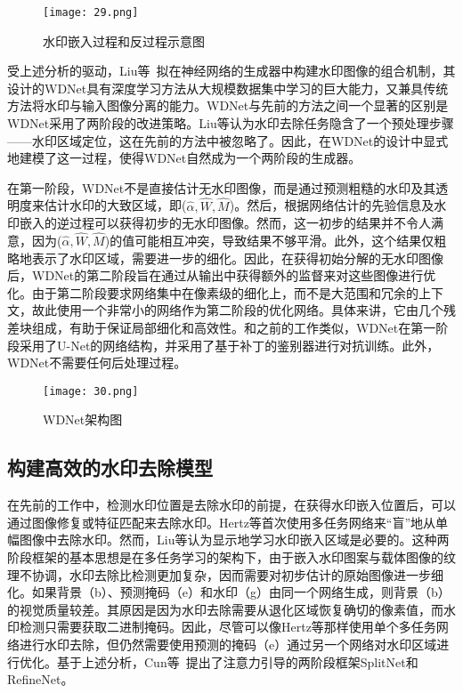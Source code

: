 \begin{figure}[!htbp]
	\centering
	\texttt{[image: 29.png]}
	\caption{水印嵌入过程和反过程示意图}
	\label{fig:29}
\end{figure}

受上述分析的驱动，Liu等~\cite{liu2021wdnet}拟在神经网络的生成器中构建水印图像的组合机制，其设计的WDNet具有深度学习方法从大规模数据集中学习的巨大能力，又兼具传统方法将水印与输入图像分离的能力。WDNet与先前的方法之间一个显著的区别是WDNet采用了两阶段的改进策略。Liu等认为水印去除任务隐含了一个预处理步骤——水印区域定位，这在先前的方法中被忽略了。因此，在WDNet的设计中显式地建模了这一过程，使得WDNet自然成为一个两阶段的生成器。

在第一阶段，WDNet不是直接估计无水印图像，而是通过预测粗糙的水印及其透明度来估计水印的大致区域，即($\hat{\alpha}, \hat{W}, \hat{M}$)。然后，根据网络估计的先验信息及水印嵌入的逆过程可以获得初步的无水印图像。然而，这一初步的结果并不令人满意，因为($\hat{\alpha}, \hat{W}, \hat{M}$)的值可能相互冲突，导致结果不够平滑。此外，这个结果仅粗略地表示了水印区域，需要进一步的细化。因此，在获得初始分解的无水印图像后，WDNet的第二阶段旨在通过从输出中获得额外的监督来对这些图像进行优化。由于第二阶段要求网络集中在像素级的细化上，而不是大范围和冗余的上下文，故此使用一个非常小的网络作为第二阶段的优化网络。具体来讲，它由几个残差块组成，有助于保证局部细化和高效性。和之前的工作类似，WDNet在第一阶段采用了U-Net的网络结构，并采用了基于补丁的鉴别器进行对抗训练。此外，WDNet不需要任何后处理过程。

\begin{figure}[!htbp]
	\centering
	\texttt{[image: 30.png]}
	\caption{WDNet架构图}
	\label{fig:30}
\end{figure}

\subsection{构建高效的水印去除模型}

在先前的工作中，检测水印位置是去除水印的前提，在获得水印嵌入位置后，可以通过图像修复或特征匹配来去除水印。Hertz等首次使用多任务网络来“盲”地从单幅图像中去除水印。然而，Liu等认为显示地学习水印嵌入区域是必要的。这种两阶段框架的基本思想是在多任务学习的架构下，由于嵌入水印图案与载体图像的纹理不协调，水印去除比检测更加复杂，因而需要对初步估计的原始图像进一步细化。如果背景（b）、预测掩码（e）和水印（g）由同一个网络生成，则背景（b）的视觉质量较差。其原因是因为水印去除需要从退化区域恢复确切的像素值，而水印检测只需要获取二进制掩码。因此，尽管可以像Hertz等那样使用单个多任务网络进行水印去除，但仍然需要使用预测的掩码（e）通过另一个网络对水印区域进行优化。基于上述分析，Cun等~\cite{cun2021split}提出了注意力引导的两阶段框架SplitNet和RefineNet。

